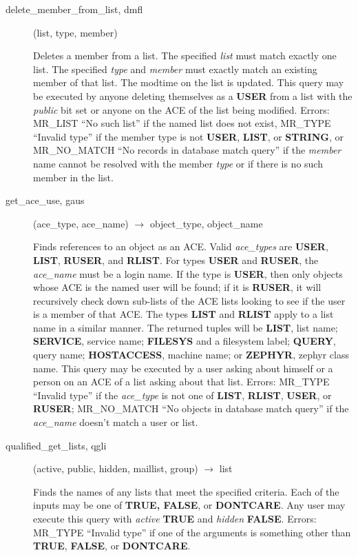 \begin{description}
\item[delete\_member\_from\_list, dmfl](list, type, member)

Deletes a member from a list.  The specified {\em list} must match exactly
one list.  The specified {\em type} and {\em member} must exactly match an
existing member of that list.  The modtime on the list is updated.
This query may be executed by anyone deleting themselves as a {\bf USER}
from a list with the {\em public} bit set or anyone on the ACE of the list
being modified.  Errors: MR\_LIST ``No such list'' if the named list
does not exist, MR\_TYPE ``Invalid type'' if the member type is not
{\bf USER}, {\bf LIST}, or {\bf STRING}, or MR\_NO\_MATCH ``No records in database
match query'' if the {\em member} name cannot be resolved with the member
{\em type} or if there is no such member in the list.

\item[get\_ace\_use, gaus](ace\_type, ace\_name) $\rightarrow$ object\_type, object\_name

Finds references to an object as an ACE.  Valid {\em ace\_types} are
{\bf USER}, {\bf LIST}, {\bf RUSER}, and {\bf RLIST}.  For types {\bf USER} and
{\bf RUSER}, the {\em ace\_name} must be a login name.  If the type is
{\bf USER}, then only objects whose ACE is the named user will be found;
if it is {\bf RUSER}, it will recursively check down sub-lists of the
ACE lists looking to see if the user is a member of that ACE.  The
types {\bf LIST} and {\bf RLIST} apply to a list name in a similar manner.
The returned tuples will be {\bf LIST}, list name; {\bf SERVICE}, service
name; {\bf FILESYS} and a filesystem label; {\bf QUERY}, query name;
{\bf HOSTACCESS}, machine name; or {\bf ZEPHYR}, zephyr class name.  This
query may be executed by a user asking about himself or a person on an
ACE of a list asking about that list.  Errors: MR\_TYPE ``Invalid type''
if the {\em ace\_type} is not one of {\bf LIST}, {\bf RLIST}, {\bf USER}, or
{\bf RUSER}; MR\_NO\_MATCH ``No objects in database match query'' if the
{\em ace\_name} doesn't match a user or list.

\item[qualified\_get\_lists, qgli](active, public, hidden, maillist,
group) $\rightarrow$ list

Finds the names of any lists that meet the specified criteria.  Each
of the inputs may be one of {\bf TRUE, FALSE}, or {\bf DONTCARE}.  Any
user may execute this query with {\em active} {\bf TRUE} and {\em hidden}
{\bf FALSE}.  Errors: MR\_TYPE ``Invalid type'' if one of the arguments is
something other than {\bf TRUE}, {\bf FALSE}, or {\bf DONTCARE}.


\end{description}
